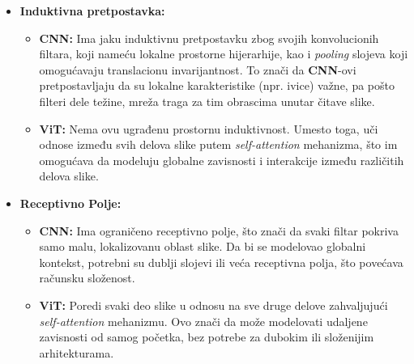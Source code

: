 \documentclass[12pt]{article}
\begin{document}
   \begin{itemize}
      \item \textbf{Induktivna pretpostavka:}
      \begin{itemize}
         \item \textbf{CNN:} Ima jaku induktivnu pretpostavku zbog svojih konvolucionih filtara, 
         koji nameću lokalne prostorne hijerarhije, kao i \textit{pooling} slojeva
         koji omogućavaju translacionu invarijantnost. To znači 
         da \textbf{CNN}-ovi pretpostavljaju da su lokalne karakteristike (npr. ivice) važne, pa pošto
         filteri dele težine, mreža traga za tim obrascima unutar čitave slike.
         \item \textbf{ViT:} Nema ovu ugrađenu prostornu induktivnost. Umesto toga, uči 
         odnose između svih delova slike putem \textit{self-attention} mehanizma, što im 
         omogućava da modeluju globalne zavisnosti i interakcije između različitih delova slike.
      \end{itemize}
      \item \textbf{Receptivno Polje:}
      \begin{itemize}
         \item \textbf{CNN:} Ima ograničeno receptivno polje, što znači da svaki filtar pokriva 
         samo malu, lokalizovanu oblast slike. Da bi se modelovao globalni kontekst, potrebni su 
         dublji slojevi ili veća receptivna polja, što povećava računsku složenost.
         \item \textbf{ViT:} Poredi svaki deo slike u odnosu na sve druge delove zahvaljujući
         \textit{self-attention} mehanizmu. Ovo znači da može modelovati udaljene zavisnosti od 
         samog početka, bez potrebe za dubokim ili složenijim arhitekturama.
      \end{itemize}
   \end{itemize}
\end{document}
